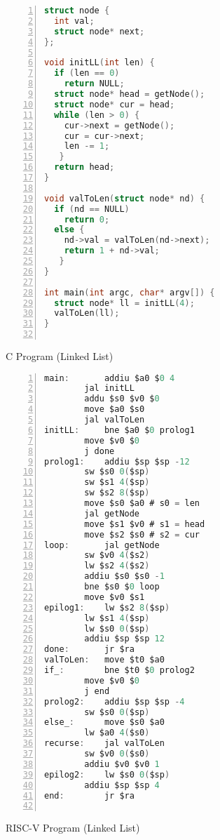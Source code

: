 \documentclass{article}
\begin{document}
\begin{figure}
\centering
\begin{minipage}{0.45\textwidth}
\renewcommand{\ttdefault}{pcr}
\begin{lstlisting}[language=C, basicstyle=\ttfamily, numbers=left, stepnumber=1, firstnumber=1, numberfirstline=true]
struct node {
  int val;
  struct node* next;
};

void initLL(int len) {
  if (len == 0)
    return NULL;
  struct node* head = getNode();
  struct node* cur = head;
  while (len > 0) {
    cur->next = getNode();
    cur = cur->next;
    len -= 1;
   }
  return head;
}

void valToLen(struct node* nd) {
  if (nd == NULL)
    return 0;
  else {
    nd->val = valToLen(nd->next);
    return 1 + nd->val;
   }
}

int main(int argc, char* argv[]) {
  struct node* ll = initLL(4);
  valToLen(ll);
}
  
\end{lstlisting}
\caption{C Program (Linked List)}
\vfill
\end{minipage}\hfill
%
\begin{minipage}{0.45\textwidth}
\raggedright
\renewcommand{\ttdefault}{pcr}
\begin{lstlisting}[language=C, basicstyle=\ttfamily, keywordstyle=\bfseries, showstringspaces=false, morekeywords={jal, addu, move, bne, j, sw, addiu, lw, jr}, numbers=left, stepnumber=1, firstnumber=1, numberfirstline=true, numberstyle=\small]
main:		addiu $a0 $0 4
		jal initLL
		addu $s0 $v0 $0
		move $a0 $s0
		jal valToLen
initLL: 	bne $a0 $0 prolog1
		move $v0 $0
		j done
prolog1:  	addiu $sp $sp -12
		sw $s0 0($sp)
		sw $s1 4($sp)
		sw $s2 8($sp)
		move $s0 $a0 # s0 = len
		jal getNode
		move $s1 $v0 # s1 = head
		move $s2 $s0 # s2 = cur	
loop:		jal getNode
		sw $v0 4($s2)
		lw $s2 4($s2)
		addiu $s0 $s0 -1
		bne $s0 $0 loop
		move $v0 $s1
epilog1:	lw $s2 8($sp)
		lw $s1 4($sp)
		lw $s0 0($sp)
		addiu $sp $sp 12
done:		jr $ra 
valToLen:	move $t0 $a0
if_:		bne $t0 $0 prolog2
		move $v0 $0
		j end
prolog2:	addiu $sp $sp -4
		sw $s0 0($sp)
else_:		move $s0 $a0
		lw $a0 4($s0)
recurse:	jal valToLen
		sw $v0 0($s0)
		addiu $v0 $v0 1
epilog2:	lw $s0 0($sp)
		addiu $sp $sp 4
end:		jr $ra
		
\end{lstlisting}
\caption{RISC-V Program (Linked List)}
\end{minipage}
%
\end{figure}
\end{document}
